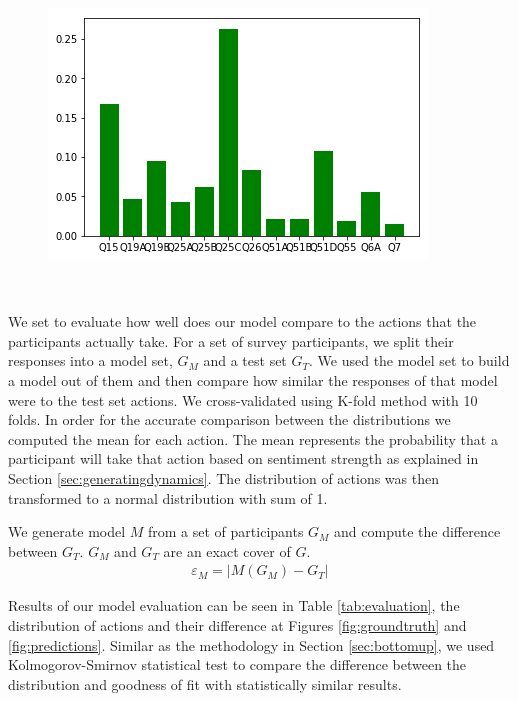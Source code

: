 {\begin{figure}[t!]
\begin{minipage}{0.24\textwidth}
	\end{minipage}
	\begin{minipage}{0.24\textwidth}%
		\includegraphics[width=\linewidth]{Images/random_pred_2012.png}
	\end{minipage}\\
	\label{fig:random}
\end{figure}

We set to evaluate how well does our model compare to the actions that the participants actually take. For a set of survey participants, we split their responses into a model set, $G_M$ and a test set $G_T$. We used the model set to build a model out of them and then compare how similar the responses of that model were to the test set actions. We cross-validated using K-fold method with 10 folds. In order for the accurate comparison between the distributions we computed the mean for each action. The mean represents the probability that a participant will take that action based on sentiment strength as explained in Section \ref{sec:generatingdynamics}. The distribution of actions was then transformed to a normal distribution with sum of 1. 

We generate model $M$ from a set of participants $G_M$ and compute the difference between $G_T$. $G_M$ and $G_T$ are an exact cover of $G$.
\begin{eqnarray}
\varepsilon_{M}=|M(G_M) - G_T| 
\end{eqnarray}

Results of our model evaluation can be seen in Table \ref{tab:evaluation}, the distribution of actions and their difference at Figures \ref{fig:groundtruth} and \ref{fig:predictions}. Similar as the methodology in Section \ref{sec:bottomup}, we used Kolmogorov-Smirnov statistical test to compare the difference between the distribution and goodness of fit with statistically similar results. 



}
